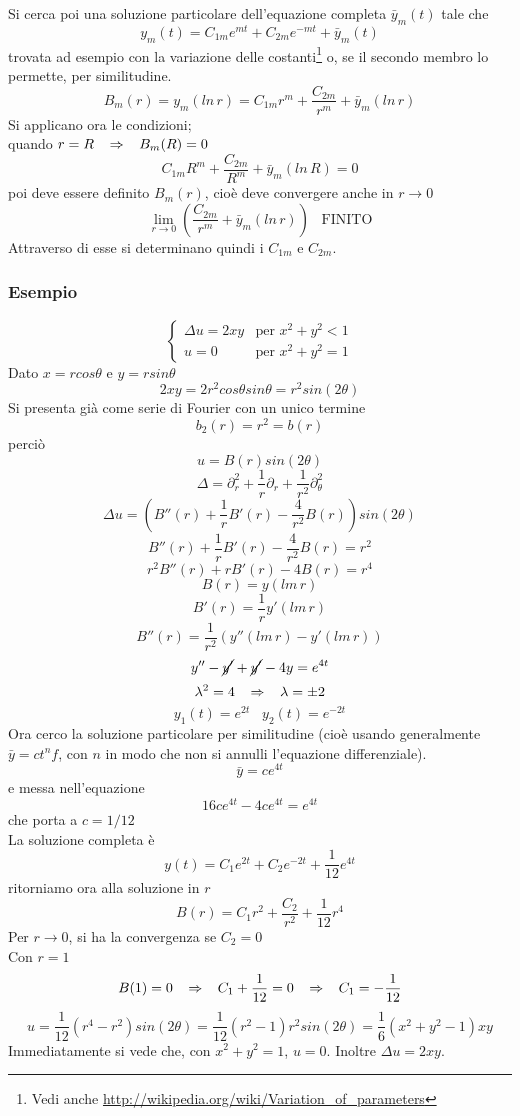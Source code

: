 Si cerca poi una soluzione particolare dell'equazione completa $\bar{y}_m(t)$
tale che
\[
	y_m(t)= C_{1m}e^{mt} + C_{2m}e^{-mt} + \bar{y}_m(t)
\]
trovata ad esempio con la variazione delle costanti\footnote{
Vedi anche \url{http://wikipedia.org/wiki/Variation_of_parameters}}
o, se il secondo membro lo permette, per similitudine.
\[
	B_m (r)= y_m(ln \, r) = C_{1m}r^m + \frac{C_{2m}}{r^m} + \bar{y}_m(ln \,
r)
\]
Si applicano ora le condizioni;\\
quando $r=R \;\;\; \Rightarrow \;\;\; B_m (R)=0$
\[
	C_{1m}R^m + \frac{C_{2m}}{R^m} + \bar{y}_m(ln \, R)=0
\]
poi deve essere definito $B_m(r)$, cio\`e deve convergere anche in $r \to 0$
\[
	\lim_{r \to 0} \left(
	\frac{C_{2m}}{r^m} + \bar{y}_m(ln \, r) \right) \;\;\; \text{FINITO}
\]
Attraverso di esse si determinano quindi i $C_{1m}$ e $C_{2m}$.
\subsubsection{Esempio}
\[
	\left\{
	\begin{array}{ll}
		\Delta u= 2xy	& \text{per } x^2 +y^2 <1 \\
		u=0		& \text{per } x^2+y^2=1
	\end{array}
	\right.
\]
Dato $x= rcos \theta$ e $y= rsin\theta$
\[
	2xy= 2r^2 cos \theta sin \theta= r^2 sin(2\theta)
\]
Si presenta gi\`a come serie di Fourier con un unico termine
\[
	b_2(r)=r^2= b(r)
\]
perci\`o
\[
	u= B(r) sin(2\theta)
\]
\[
	\Delta = \partial_r^2 +\frac{1}{r}\partial_r +
\frac{1}{r^2}\partial_{\theta}^2
\]
\[
	\Delta u= \left(
	B''(r) + \frac{1}{r} B' (r) - \frac{4}{r^2} B(r)
	\right) sin (2 \theta)
\]
\[
	B''(r) +\frac{1}{r}B'(r) - \frac{4}{r^2}B(r)= r^2
\]
\[
	r^2 B''(r) +rB'(r) - 4B(r)= r^4
\]
\[
	B(r)= y(lm \, r)
\]
\[
	B'(r)= \frac{1}{r}y'(lm \, r)
\]
\[
	B''(r)= \frac{1}{r^2}\left( y''(lm \, r) - y'(lm \, r) \right)
\]
\[
	y'' - \cancel{y'} + \cancel{y'} - 4y= e^{4t}
\]
\[
	\lambda^2=4 \;\;\; \Rightarrow \;\;\; \lambda=\pm 2
\]
\[
	y_1(t)= e^{2t} \;\;\; y_2(t)= e^{-2t}
\]
Ora cerco la soluzione particolare per similitudine (cio\`e usando
generalmente $\bar{y}= c t^n f$, con $n$ in modo che non si annulli
l'equazione differenziale).
\[
	\bar{y}= c e^{4t}
\]
e messa nell'equazione
\[
	16ce^{4t} - 4ce^{4t}= e^{4t}
\]
che porta a $c= 1/12$\\
La soluzione completa \`e
\[
	y(t)= C_1e^{2t} + C_2e^{-2t} + \frac{1}{12}e^{4t}
\]
ritorniamo ora alla soluzione in $r$
\[
	B(r)= C_1 r^2 + \frac{C_2}{r^2} + \frac{1}{12}r^4
\]
Per $r \to 0$, si ha la convergenza se $C_2=0$\\
Con $r=1$
\[
	B(1)=0 \;\;\; \Rightarrow \;\;\; C_1+ \frac{1}{12}=0 \;\;\; \Rightarrow \;\;\; C_1= - \frac{1}{12}
\]
\[
	u= \frac{1}{12}(r^4 - r^2)sin(2 \theta)= \frac{1}{12}(r^2 -1)r^2 sin(2\theta) =
	\frac{1}{6}(x^2 + y^2 -1)xy
\]
Immediatamente si vede che, con $x^2 + y^2 =1$, $u=0$.
Inoltre $\Delta u= 2xy$.

